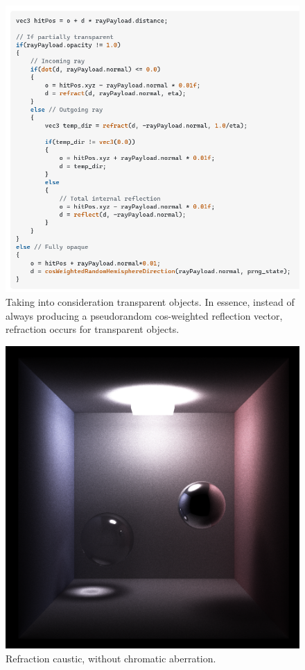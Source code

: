 \documentclass[12pt]{article}
\begin{document}
\begin{figure} 
\centering
  \includegraphics[width = 6 in]{code.png}
  \caption{ Taking into consideration transparent objects.
In essence, instead of always producing a pseudorandom cos-weighted reflection vector, refraction occurs for transparent objects.
}
\end{figure}

\begin{figure} 
\centering
  \includegraphics[width = 6 in]{v_rt_reflect_no_chromatic_aberration_low_res.png}
  \caption{ Refraction caustic, without chromatic aberration.
}
\end{figure}
\end{document}
